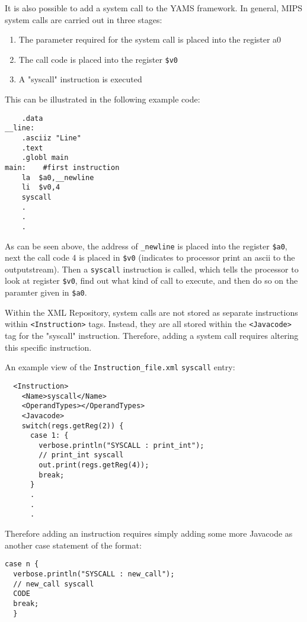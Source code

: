 It is also possible to add a system call to the YAMS framework. In general, MIPS system calls are carried out in three stages:

\begin{enumerate}
\item The parameter required for the system call is placed into the register a0
\item The call code is placed into the register \verb"$v0"
\item A "syscall" instruction is executed
\end{enumerate}

This can be illustrated in the following example code:

\begin{verbatim}
    .data
__line:
    .asciiz	"Line"
    .text
    .globl main
main:    #first instruction
    la	$a0,__newline
    li	$v0,4
    syscall
    .
    .
    .
\end{verbatim}

As can be seen above, the address of \verb"_newline" is placed into the register \verb"$a0", next the call code 4 is placed in \verb"$v0" (indicates to processor print an ascii to the outputstream). Then a \verb"syscall" instruction is called, which tells the processor to look at register \verb"$v0", find out what kind of call to execute, and then do so on the paramter given in \verb"$a0".

Within the XML Repository, system calls are not stored as separate instructions within \verb"<Instruction>" tags. Instead, they are all stored within the \verb"<Javacode>" tag for the "syscall" instruction. Therefore, adding a system call requires altering this specific instruction.

An example view of the \verb"Instruction_file.xml" \verb"syscall" entry:

\begin{verbatim}
  <Instruction>
    <Name>syscall</Name>
    <OperandTypes></OperandTypes>
    <Javacode>
    switch(regs.getReg(2)) {
      case 1: {
        verbose.println("SYSCALL : print_int");
        // print_int syscall
        out.print(regs.getReg(4));
        break;
      }
      .
      .
      .
\end{verbatim}

Therefore adding an instruction requires simply adding some more Javacode as another case statement of the format:

\begin{verbatim}
case n {
  verbose.println("SYSCALL : new_call");
  // new_call syscall
  CODE
  break;
  }
\end{verbatim}


